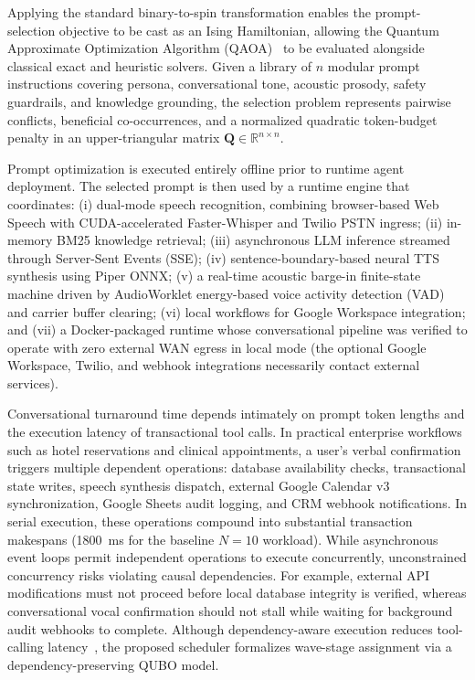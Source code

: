 \documentclass[review,12pt,times,authoryear]{elsarticle}
\theoremstyle{definition}
\begin{document}
Applying the standard binary-to-spin transformation enables the prompt-selection objective to be cast as an Ising Hamiltonian, allowing the Quantum Approximate Optimization Algorithm (QAOA)~\citep{Zhou2020} to be evaluated alongside classical exact and heuristic solvers. Given a library of $n$ modular prompt instructions covering persona, conversational tone, acoustic prosody, safety guardrails, and knowledge grounding, the selection problem represents pairwise conflicts, beneficial co-occurrences, and a normalized quadratic token-budget penalty in an upper-triangular matrix $\mathbf{Q} \in \mathbb{R}^{n \times n}$.

Prompt optimization is executed entirely offline prior to runtime agent deployment. The selected prompt is then used by a runtime engine that coordinates: (i) dual-mode speech recognition, combining browser-based Web Speech with CUDA-accelerated Faster-Whisper and Twilio PSTN ingress; (ii) in-memory BM25 knowledge retrieval; (iii) asynchronous LLM inference streamed through Server-Sent Events (SSE); (iv) sentence-boundary-based neural TTS synthesis using Piper ONNX; (v) a real-time acoustic barge-in finite-state machine driven by AudioWorklet energy-based voice activity detection (VAD) and carrier buffer clearing; (vi) local workflows for Google Workspace integration; and (vii) a Docker-packaged runtime whose conversational pipeline was verified to operate with zero external WAN egress in local mode (the optional Google Workspace, Twilio, and webhook integrations necessarily contact external services).

Conversational turnaround time depends intimately on prompt token lengths and the execution latency of transactional tool calls. In practical enterprise workflows such as hotel reservations and clinical appointments, a user's verbal confirmation triggers multiple dependent operations: database availability checks, transactional state writes, speech synthesis dispatch, external Google Calendar v3 synchronization, Google Sheets audit logging, and CRM webhook notifications. In serial execution, these operations compound into substantial transaction makespans (\SI{1800}{\milli\second} for the baseline $N=10$ workload). While asynchronous event loops permit independent operations to execute concurrently, unconstrained concurrency risks violating causal dependencies. For example, external API modifications must not proceed before local database integrity is verified, whereas conversational vocal confirmation should not stall while waiting for background audit webhooks to complete. Although dependency-aware execution reduces tool-calling latency~\citep{Kim2024}, the proposed scheduler formalizes wave-stage assignment via a dependency-preserving QUBO model.
\end{document}
